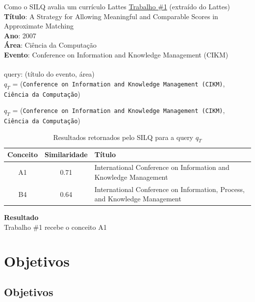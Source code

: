 \documentclass{beamer}
\begin{document}
\begin{frame}{Como o SILQ avalia um currículo Lattes}
  \underline{Trabalho \#1} (extraído do Lattes)\\
  \textbf{Título}: A Strategy for Allowing Meaningful and Comparable Scores in Approximate Matching\\
  \textbf{Ano}: 2007\\
  \textbf{Área}: Ciência da Computação\\
  \textbf{Evento}: Conference on Information and Knowledge Management (CIKM)\\

  \pause
  \hfill \\
  query: (título do evento, área)\\
  $q_T$ = (\texttt{Conference on Information and Knowledge Management (CIKM)}, \texttt{Ciência da Computação})
\end{frame}

\begin{frame}
  $q_T$ = (\texttt{Conference on Information and Knowledge Management (CIKM)}, \texttt{Ciência da Computação})

  \pause
  \footnotesize
  \begin{table}
    \begin{tabular}{ c | c | p{6.5cm} }
      \textbf{Conceito} & \textbf{Similaridade} & \textbf{Título}\\
      \hline \hline

      A1 & 0.71 & International Conference on Information and Knowledge Management\\ \hline
      B4 & 0.64 & International Conference on Information, Process, and Knowledge Management\\
    \end{tabular}
    \caption{Resultados retornados pelo SILQ para a query $q_T$}
  \end{table}

  \normalsize
  \textbf{Resultado}\\
  Trabalho \#1 recebe o conceito A1
\end{frame}

\section{Objetivos}
\subsection*{Objetivos}
\end{document}
